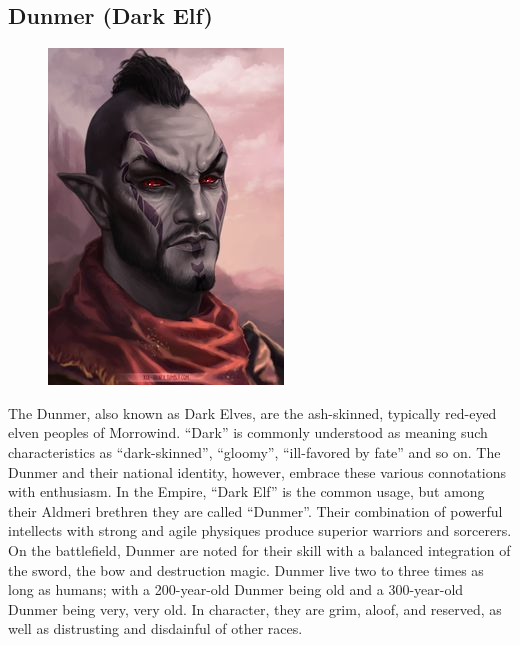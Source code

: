 \documentclass[12pt]{book}
\begin{document}
\subsection{Dunmer (Dark Elf)}
\begin{figure}
	\includegraphics[width=\textwidth]{Dunmer.png}
\end{figure}

The Dunmer, also known as Dark Elves, are the ash-skinned, typically red-eyed elven peoples of Morrowind. ``Dark'' is commonly understood as meaning such characteristics as ``dark-skinned'', ``gloomy'', ``ill-favored by fate'' and so on. The Dunmer and their national identity, however, embrace these various connotations with enthusiasm. In the Empire, ``Dark Elf'' is the common usage, but among their Aldmeri brethren they are called ``Dunmer''. Their combination of powerful intellects with strong and agile physiques produce superior warriors and sorcerers. On the battlefield, Dunmer are noted for their skill with a balanced integration of the sword, the bow and destruction magic. Dunmer live two to three times as long as humans; with a 200-year-old Dunmer being old and a 300-year-old Dunmer being very, very old. In character, they are grim, aloof, and reserved, as well as distrusting and disdainful of other races.\\
\end{document}
